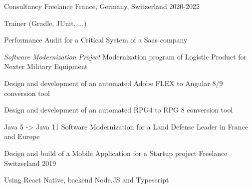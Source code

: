 

\begin{cventries}


\cventry
{Consultancy} %
{Freelance} %
{France, Germany, Switzerland} %
{2020-2022} %
{
  \begin{cvitems} %
    \item{Trainer (Gradle, JUnit, ...)}
    \item{Performance Audit for a Critical System of a Saas company}
    \item{\emph{Software Modernization Project} Modernization program of Logistic Product for Nexter Military Equipment}
    \item{Design and development of an automated Adobe FLEX to Angular 8/9 conversion tool}
    \item{Design and development of an automated RPG4 to RPG 8 conversion tool}
    \item{Java 5 -> Java 11 Software Modernization for a Land Defense Leader in France and Europe}
  \end{cvitems}
}


\cventry
{Design and build of a Mobile Application for a Startup project} %
{Freelance} %
{Switzerland} %
{2019} %
{
  \begin{cvitems} %
  \item {Using React Native, backend Node.JS and Typescript}
  \end{cvitems}
}


\end{cventries}
